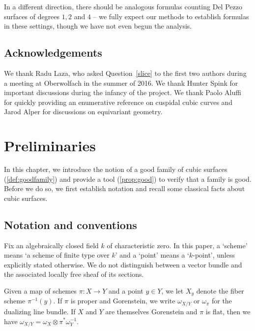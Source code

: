 \documentclass[12pt,reqno]{amsart}
\renewcommand{\k}{k}
\renewcommand{\to}{{\longrightarrow}}
\numberwithin{equation}{section}
\begin{document}
In a different direction, there should be analogous formulas counting
Del Pezzo surfaces of degrees $1,2$ and $4$ -- we fully expect our
methods to establish formulas in these settings, though we have not
even begun the analysis.  



\subsection{Acknowledgements}
We thank Radu Laza, who asked Question~\ref{slice} to the first two
authors during a meeting at Oberwolfach in the summer of 2016.  We
thank Hunter Spink for important discussions during the infancy
of the project.  We thank Paolo Aluffi for quickly providing an
enumerative reference on cuspidal cubic curves and Jarod Alper for discussions on equivariant geometry.



  




\section{Preliminaries}
\label{sec:good}

In this chapter, we introduce the notion of a good family of cubic
surfaces (\autoref{def:goodfamily}) and provide a tool
(\autoref{prop:good}) to verify that a family is good.  Before we do
so, we first establish notation and recall some classical facts about
cubic surfaces.

\subsection{Notation and conventions}
\label{sec:notation-conventions}
Fix an algebraically closed field $\k$ of characteristic zero.  In
this paper, a `scheme' means `a scheme of finite type over $\k$' and a
`point' means a `$\k$-point', unless explicitly stated otherwise.  We
do not distinguish between a vector bundle and the associated locally
free sheaf of its sections.

Given a map of schemes $\pi \colon X \to Y$ and a point $y \in Y$, we
let $X_y$ denote the fiber scheme $\pi^{-1}(y)$.  If $\pi$ is proper
and Gorenstein, we write $\omega_{X/Y}$ or $\omega_\pi$ for the
dualizing line bundle.  If $X$ and $Y$ are themselves Gorenstein and
$\pi$ is flat, then we have
$\omega_{X/Y} = \omega_X \otimes \pi^*\omega_Y^{-1}$.
\end{document}
